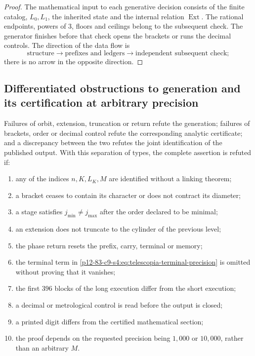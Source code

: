 \begin{proof}
The mathematical input to each generative decision consists of the finite
catalog, \(L_0,L_1\), the inherited state and the internal relation
\(\operatorname{Ext}\). The rational endpoints, powers of \(3\), floors and
ceilings belong to the subsequent check. The generator finishes before
that check opens the brackets or runs the decimal controls. The direction
of the data flow is
\[
 \text{structure}\longrightarrow
 \text{prefixes and ledgers}\longrightarrow
 \text{independent subsequent check};
\]
there is no arrow in the opposite direction.
\end{proof}

\subsection{Differentiated obstructions to generation and its certification at arbitrary precision}

\begin{criterion}
Failures of orbit, extension, truncation or return refute the generation;
failures of brackets, order or decimal control refute the corresponding
analytic certificate; and a discrepancy between the two refutes the
joint identification of the published output. With this separation of types,
the complete assertion is refuted if:
\begin{enumerate}
 \item any of the indices \(n,K,L_K,M\) are identified without a
       linking theorem;
 \item a bracket ceases to contain its character or does not contract its diameter;
 \item a stage satisfies \(j_{\min}\ne j_{\max}\) after the order
       declared to be minimal;
 \item an extension does not truncate to the cylinder of the previous level;
 \item the phase return resets the prefix, carry, terminal or memory;
 \item the terminal term in
       \eqref{p12-83-c9-s4:eq:telescopia-terminal-precision} is omitted without proving that it vanishes;
 \item the first \(396\) blocks of the long execution differ from the
       short execution;
 \item a decimal or metrological control is read before the output is closed;
 \item a printed digit differs from the certified mathematical section;
 \item the proof depends on the requested precision being \(1,000\) or
       \(10,000\), rather than an arbitrary \(M\).
\end{enumerate}
\end{criterion}
